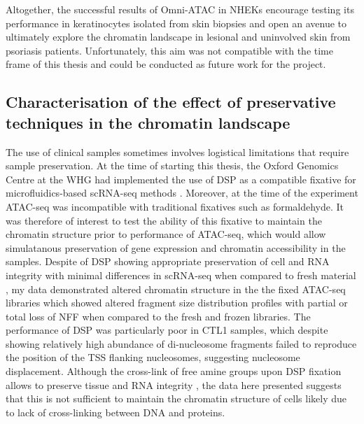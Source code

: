 Altogether, the successful results of Omni-ATAC in NHEKs encourage testing its performance in keratinocytes isolated from skin biopsies and open an avenue to ultimately explore the chromatin landscape in lesional and uninvolved skin from psoriasis patients. Unfortunately, this aim was not compatible with the time frame of this thesis and could be conducted as future work for the project.



\subsection{Characterisation of the effect of preservative techniques in the chromatin landscape}
The use of clinical samples sometimes involves logistical limitations that require sample preservation. At the time of starting this thesis, the Oxford Genomics Centre at the WHG had implemented the use of DSP as a compatible fixative for microfluidics-based scRNA-seq methods \parencite{Attar2018}. Moreover, at the time of the experiment ATAC-seq was incompatible with traditional fixatives such as formaldehyde. It was therefore of interest to test the ability of this fixative to maintain the chromatin structure prior to performance of ATAC-seq, which would allow simulatanous preservation of gene expression and chromatin accessibility in the samples. Despite of DSP showing appropriate preservation of cell and RNA integrity with minimal differences in scRNA-seq when compared to fresh material \parencite{Attar2018}, my data demonstrated altered chromatin structure in the the fixed ATAC-seq libraries which showed altered fragment size distribution profiles with partial or total loss of NFF when compared to the fresh and frozen libraries. The performance of DSP was particularly poor in CTL1 samples, which despite showing relatively high abundance of di-nucleosome fragments failed to reproduce the position of the TSS flanking nucleosomes, suggesting nucleosome displacement. Although the cross-link of free amine groups upon DSP fixation allows to preserve tissue and RNA integrity \parencite{Espina2013,Attar2018}, the data here presented suggests that this is not sufficient to maintain the chromatin structure of cells likely due to lack of cross-linking between DNA and proteins. 

